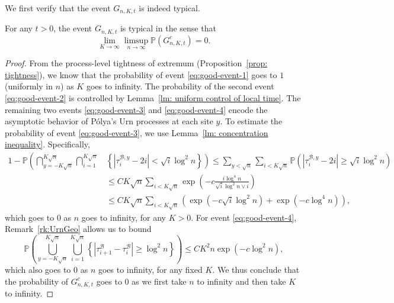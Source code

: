 \documentclass[EJP]{ejpecp} %
\begin{document}
We first verify that the event $G_{n, K, t}$ is indeed typical.
\begin{lemma}
	\label{lm:good-event}
	For any $t > 0$, the event $G_{n,K,t}$ is typical in the sense that
	\[
	\lim_{K \to \infty } \limsup_{n \to \infty } 
	\mathbb{P}(G^c_{n, K,t}) = 0
	.\] 
\end{lemma}
\begin{proof}%
	From the process-level tightness of extremum (Proposition~\ref{prop: tightness}), we know that the probability of event \eqref{eq:good-event-1} goes to $1$ (uniformly in $n$) as $K $ goes to infinity. The probability of the second event \eqref{eq:good-event-2} is controlled by Lemma~\ref{lm: uniform control of local time}. 
	The remaining two events \eqref{eq:good-event-3} and \eqref{eq:good-event-4} encode the asymptotic behavior of P\'{o}lya's Urn processes at each site $y$. To estimate the probability of event \eqref{eq:good-event-3}, we use Lemma~\ref{lm: concentration inequality}. Specifically,
	\begin{align*}
		1-\mathbb{P}\left(\bigcap_{y = -K \sqrt{n}}^{K \sqrt{n} }\bigcap_{i = 1}^{K \sqrt{n} }\right. &\left. \left\{\left| \tau_i^{\mathscr{B},y} - 2 i \right| < \sqrt{ i } \log^2 n \right\}
		\right) 
		\le \sum_{y < \sqrt{n} }\sum_{i < K \sqrt{ n} } \mathbb{P}\left( |\tau_i^{\mathscr{B},y} - 2i| \ge \sqrt{i} \log^2 n \right) \\
		&\le CK \sqrt{n} \sum_{i < K \sqrt{ n} } \exp\left( - c \frac{i \log^4 n}{\sqrt{i}  \log^2 n \vee i} \right)  \\
		&\le CK \sqrt{n}  \sum_{i < K \sqrt{ n} }  
		\left( \exp\left( - c \sqrt{i}  \log^2 n \right)  + 
		\exp\left( - c \log^4 n \right) \right),
	\end{align*}
	which goes to $0$ as $n$ goes to infinity, for any $K>0$. 
	For event \eqref{eq:good-event-4}, Remark~\ref{rk:UrnGeo} allows us to bound
	\[
	\mathbb{P}\left(\bigcup_{y = -K \sqrt{n}}^{K \sqrt{n} }\bigcup_{i = 1}^{K \sqrt{n}}\left\{\left| \tau_{i+1}^{\mathscr{B}} - \tau_i^{\mathscr{B}} \right| \ge  \log^2 n \right\}\right) 
	\le C K^2 n \exp\left( - c \log^2 n \right) 
	,\] 
	which also goes to $0$ as $n$ goes to infinity, for any fixed $K$. We thus conclude that the probability of $G^c_{n, K, t}$ goes to $0$ as we first take $n$ to infinity and then take $K$ to infinity.
\end{proof}
\end{document}
